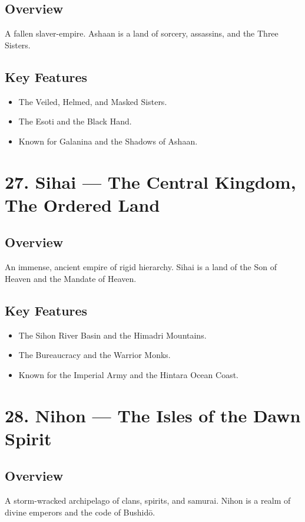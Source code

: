 \documentclass[11pt]{article}
\begin{document}
\subsection*{Overview}
A fallen slaver-empire. Ashaan is a land of sorcery, assassins, and the Three Sisters.

\subsection*{Key Features}
\begin{itemize}[leftmargin=*]
    \item The Veiled, Helmed, and Masked Sisters.
    \item The Esoti and the Black Hand.
    \item Known for Galanina and the Shadows of Ashaan.
\end{itemize}

\section*{27. Sihai — The Central Kingdom, The Ordered Land}

\subsection*{Overview}
An immense, ancient empire of rigid hierarchy. Sihai is a land of the Son of Heaven and the Mandate of Heaven.

\subsection*{Key Features}
\begin{itemize}[leftmargin=*]
    \item The Sihon River Basin and the Himadri Mountains.
    \item The Bureaucracy and the Warrior Monks.
    \item Known for the Imperial Army and the Hintara Ocean Coast.
\end{itemize}

\section*{28. Nihon — The Isles of the Dawn Spirit}

\subsection*{Overview}
A storm-wracked archipelago of clans, spirits, and samurai. Nihon is a realm of divine emperors and the code of Bushidō.
\end{document}

